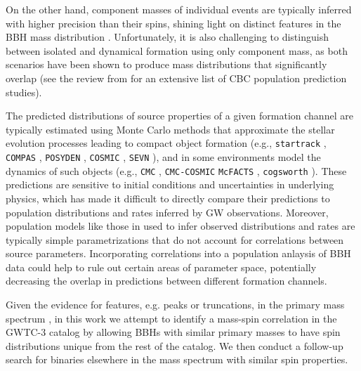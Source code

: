 On the other hand, component masses of individual events are typically inferred with higher precision than their spins, shining light on distinct features in the BBH mass distribution \citep{2021ApJ...913L..19T, 2023PhRvX..13a1048A, 2022ApJ...928..155T, 2022ApJ...924..101E,2022arXiv221012834E, 2208.11871, 2209.05766, 2301.00834}. Unfortunately, it is also challenging to distinguish between isolated and dynamical formation using only component mass, as both scenarios have been shown to produce mass distributions that significantly overlap (see the review from \citet{2022LRR....25....1M} for an extensive list of CBC population prediction studies). 

The predicted distributions of source properties of a given formation channel are typically estimated using Monte Carlo methods that approximate the stellar evolution processes leading to compact object formation (e.g., \texttt{startrack} \citep{2023arXiv230617602D}, \texttt{COMPAS} \citep{2022ApJS..258...34R}, \texttt{POSYDEN} \citep{10.3847/1538-4365/ac90c1, 2024arXiv241102376A}, \texttt{COSMIC} \citep{2021ascl.soft08022B}, \texttt{SEVN} \citep{2015MNRAS.451.4086S, 2017MNRAS.470.4739S}), and in some environments model the dynamics of such objects (e.g., \texttt{CMC} \citep{10.3847/1538-4365/ac2edf}, \texttt{CMC-COSMIC} \citep{2021ascl.soft08023R} \texttt{McFACTS} \citep{2024arXiv241016515M, 2024arXiv241110590C, 2024arXiv241018815D}, \texttt{cogsworth} \citep{2409.04543}). These predictions are sensitive to initial conditions and uncertainties in underlying physics, which has made it difficult to directly compare their predictions to population distributions and rates inferred by GW observations. Moreover, population models like those in \citet{2021arXiv211103606T} used to infer observed distributions and rates are typically simple parametrizations that do not account for correlations between source parameters. Incorporating correlations into a population anlaysis of BBH data could help to rule out certain areas of parameter space, potentially decreasing the overlap in predictions between different formation channels. 

Given the evidence for features, e.g. peaks or truncations, in the primary mass spectrum \citep{10.3847/2041-8213/aa9bf6, 10.3847/1538-4357/aab34c, 2019ApJ...882L..24A, 2021ApJ...913L...7A, 2023PhRvX..13a1048A,2104.07783v2, 2022ApJ...924..101E, 2022arXiv221012834E,2022ApJ...928..155T, 2301.00834,10.48550/arXiv.2302.07289}, in this work we attempt to identify a mass-spin correlation in the GWTC-3 catalog by allowing BBHs with similar primary masses to have spin distributions unique from the rest of the catalog. We then conduct a follow-up search for binaries elsewhere in the mass spectrum with similar spin properties. 

